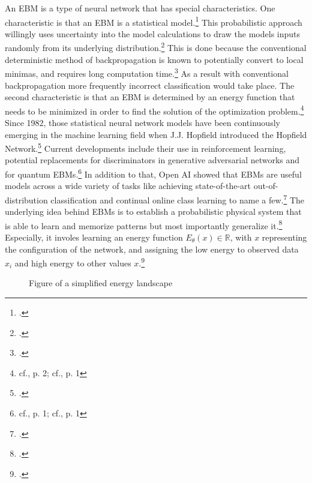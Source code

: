An \ac{EBM} is a type of neural network that has special characteristics. 
One characteristic is that an \ac{EBM} is a statistical model.\footcite[cf.][2]{huembeliPhysicsEnergybasedModels2022}
This probabilistic approach willingly uses uncertainty into the model calculations to draw the models inputs randomly from its underlying distribution.\footcite[cf.][25-27]{uusitaloOverviewMethodsEvaluate2015}
This is done because the conventional deterministic method of backpropagation is known to potentially convert to local minimas, and requires long computation time.\footcite[cf.][109]{spechtProbabilisticNeuralNetworks1990}
As a result with conventional backpropagation more frequently incorrect classification would take place.
The second characteristic is that an \ac{EBM} is determined by an energy function that needs to be minimized in order to find the solution of the optimization problem.\footnote{cf.\cite{huembeliPhysicsEnergybasedModels2022}, p. 2; cf.\cite{ranzatoEfficientLearningSparse2006}, p. 1}
Since 1982, those statistical neural network models have been continuously emerging in the machine learning field when J.J. Hopfield introduced the Hopfield Network.\footcite[cf.][]{hopfieldNeuralNetworksPhysical1982}
Current developments include their use in reinforcement learning, potential replacements for discriminators in generative adversarial networks and for quantum \ac{EBM}s.\footnote{cf.\cite{verdonQuantumHamiltonianBasedModels2019}, p. 1; cf.\cite{duModelBasedPlanning2021}, p. 1}
In addition to that, Open AI showed that \ac{EBM}s are useful models across a wide variety of tasks like achieving state-of-the-art out-of-distribution classification and continual online class learning to name a few.\footcite[cf.][1-2]{duImplicitGenerationGeneralization2020}
The underlying idea behind \ac{EBM}s is to establish a probabilistic physical system that is able to learn and memorize patterns but most importantly generalize it.\footcite[cf.][2]{huembeliPhysicsEnergybasedModels2022} 
Especially, it involes learning an energy function \(E_{\theta}(x) \in \mathbb{R}\), with \( x \) representing the configuration of the network, and assigning the low energy to observed data \(x_i\) and high energy to other values \(x\).\footcite[cf.][330]{gustafssonEnergyBasedModelsDeep2020}
\begin{figure}[H]
    \centering
    \caption{Figure of a simplified energy landscape}
\end{figure}
